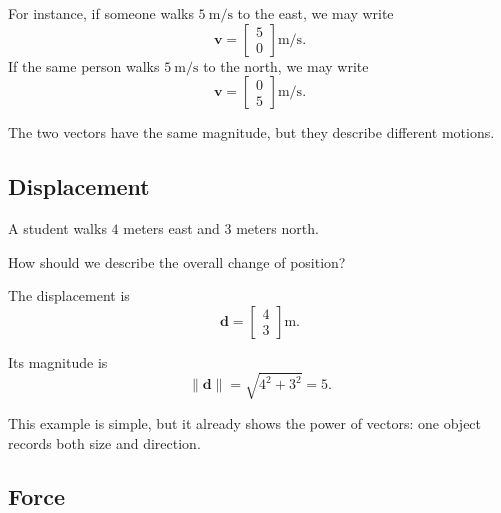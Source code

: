 \documentclass[11pt,a4paper]{article}
\newcommand{\vect}[1]{\boldsymbol{#1}}
\begin{document}
For instance, if someone walks \(5\ \mathrm{m/s}\) to the east, we may write
\[
\vect{v} =
\begin{bmatrix}
5 \\ 0
\end{bmatrix}\mathrm{m/s}.
\]
If the same person walks \(5\ \mathrm{m/s}\) to the north, we may write
\[
\vect{v} =
\begin{bmatrix}
0 \\ 5
\end{bmatrix}\mathrm{m/s}.
\]

The two vectors have the same magnitude, but they describe different motions.

\begin{center}
\end{center}

\subsection{Displacement}

\begin{problemblock}
A student walks \(4\) meters east and \(3\) meters north.

How should we describe the overall change of position?
\end{problemblock}

\begin{solutionblock}
The displacement is
\[
\vect{d} =
\begin{bmatrix}
4 \\ 3
\end{bmatrix}\mathrm{m}.
\]

Its magnitude is
\[
\lVert \vect{d} \rVert = \sqrt{4^2+3^2}=5.
\]
\end{solutionblock}

This example is simple, but it already shows the power of vectors:
one object records both size and direction.

\subsection{Force}
\end{document}
